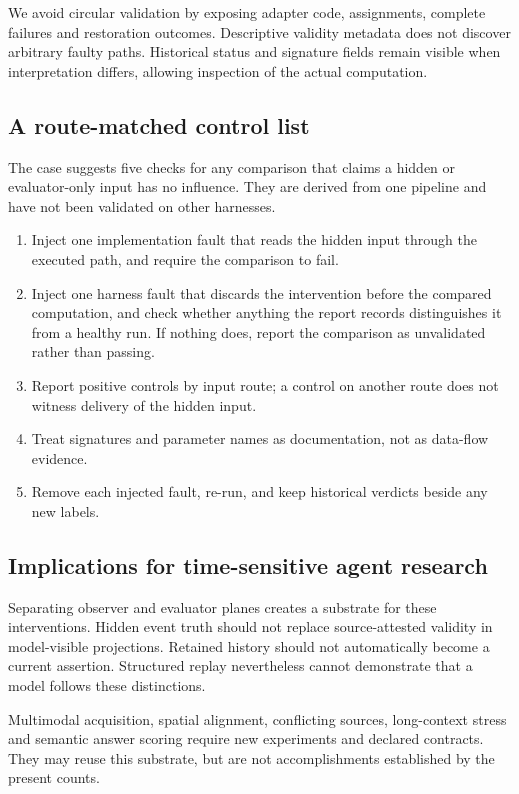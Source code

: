 \documentclass[11pt]{article}
\begin{document}
We avoid circular validation by exposing adapter code, assignments, complete failures and restoration outcomes. Descriptive validity metadata does not discover arbitrary faulty paths. Historical status and signature fields remain visible when interpretation differs, allowing inspection of the actual computation.

\subsection{A route-matched control list}
The case suggests five checks for any comparison that claims a hidden or evaluator-only input has no influence. They are derived from one pipeline and have not been validated on other harnesses.
\begin{enumerate}
\item Inject one implementation fault that reads the hidden input through the executed path, and require the comparison to fail.
\item Inject one harness fault that discards the intervention before the compared computation, and check whether anything the report records distinguishes it from a healthy run. If nothing does, report the comparison as unvalidated rather than passing.
\item Report positive controls by input route; a control on another route does not witness delivery of the hidden input.
\item Treat signatures and parameter names as documentation, not as data-flow evidence.
\item Remove each injected fault, re-run, and keep historical verdicts beside any new labels.
\end{enumerate}

\subsection{Implications for time-sensitive agent research}
Separating observer and evaluator planes creates a substrate for these interventions. Hidden event truth should not replace source-attested validity in model-visible projections. Retained history should not automatically become a current assertion. Structured replay nevertheless cannot demonstrate that a model follows these distinctions.

Multimodal acquisition, spatial alignment, conflicting sources, long-context stress and semantic answer scoring require new experiments and declared contracts. They may reuse this substrate, but are not accomplishments established by the present counts.
\end{document}
